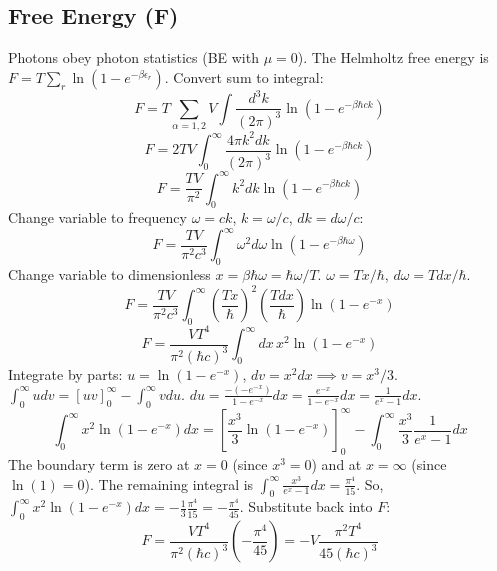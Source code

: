 \documentclass[11pt]{article}
\newcommand{\eps}{\epsilon}
\begin{document}
\subsection*{Free Energy (F)}
Photons obey photon statistics (BE with $\mu=0$). The Helmholtz free energy is $F = T \sum_r \ln(1 - e^{-\beta\eps_r})$.
Convert sum to integral:
\[ F = T \sum_{\alpha=1,2} V \int \frac{d^3k}{(2\pi)^3} \ln(1 - e^{-\beta\hbar ck}) \]
\[ F = 2 T V \int_0^\infty \frac{4\pi k^2 dk}{(2\pi)^3} \ln(1 - e^{-\beta\hbar ck}) \]
\[ F = \frac{T V}{\pi^2} \int_0^\infty k^2 dk \ln(1 - e^{-\beta\hbar ck}) \]
Change variable to frequency $\omega=ck$, $k=\omega/c$, $dk=d\omega/c$:
\[ F = \frac{T V}{\pi^2 c^3} \int_0^\infty \omega^2 d\omega \ln(1 - e^{-\beta\hbar\omega}) \]
Change variable to dimensionless $x = \beta\hbar\omega = \hbar\omega/T$. $\omega = Tx/\hbar$, $d\omega = Tdx/\hbar$.
\[ F = \frac{T V}{\pi^2 c^3} \int_0^\infty \left(\frac{Tx}{\hbar}\right)^2 \left(\frac{Tdx}{\hbar}\right) \ln(1 - e^{-x}) \]
\[ F = \frac{V T^4}{\pi^2 (\hbar c)^3} \int_0^\infty dx \, x^2 \ln(1 - e^{-x}) \]
Integrate by parts: $u = \ln(1-e^{-x})$, $dv = x^2 dx \implies v = x^3/3$.
$\int_0^\infty u dv = [uv]_0^\infty - \int_0^\infty v du$.
$du = \frac{-(-e^{-x})}{1-e^{-x}} dx = \frac{e^{-x}}{1-e^{-x}} dx = \frac{1}{e^x-1} dx$.
\[ \int_0^\infty x^2 \ln(1-e^{-x}) dx = \left[ \frac{x^3}{3} \ln(1-e^{-x}) \right]_0^\infty - \int_0^\infty \frac{x^3}{3} \frac{1}{e^x-1} dx \]
The boundary term is zero at $x=0$ (since $x^3=0$) and at $x=\infty$ (since $\ln(1)=0$).
The remaining integral is $\int_0^\infty \frac{x^3}{e^x-1} dx = \frac{\pi^4}{15}$.
So, $\int_0^\infty x^2 \ln(1-e^{-x}) dx = -\frac{1}{3} \frac{\pi^4}{15} = -\frac{\pi^4}{45}$.
Substitute back into $F$:
\[ F = \frac{V T^4}{\pi^2 (\hbar c)^3} \left( -\frac{\pi^4}{45} \right) = - V \frac{\pi^2 T^4}{45 (\hbar c)^3} \]
\end{document}

